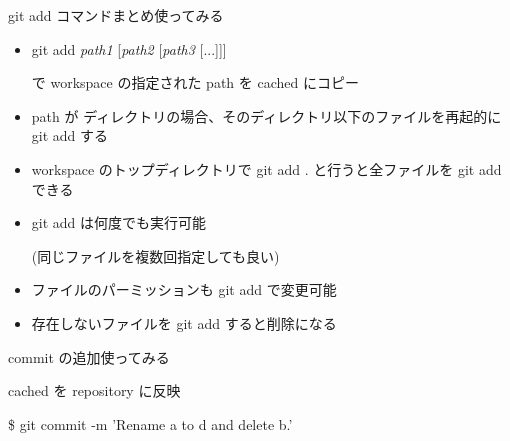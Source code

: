 \begin{frame}[t]{git add コマンドまとめ}{使ってみる}

  \begin{itemize}
  \item git add \textit{path1} [\textit{path2} [\textit{path3} [...]]]

    で workspace の指定された path を cached にコピー
    \vspace{2ex}

  \item path が ディレクトリの場合、そのディレクトリ以下のファイルを再起的に git add する
    \vspace{2ex}

  \item workspace のトップディレクトリで git add . と行うと全ファイルを git add できる
    \vspace{2ex}

  \item git add は何度でも実行可能

    (同じファイルを複数回指定しても良い)
    \vspace{2ex}

  \item ファイルのパーミッションも git add で変更可能
    \vspace{2ex}

  \item 存在しないファイルを git add すると削除になる
  \end{itemize}

\end{frame}


\begin{frame}[t]{commit の追加}{使ってみる}

  cached を repository に反映
  \vspace{2ex}

  \$ git commit -m 'Rename a to d and delete b.'
\end{frame}


